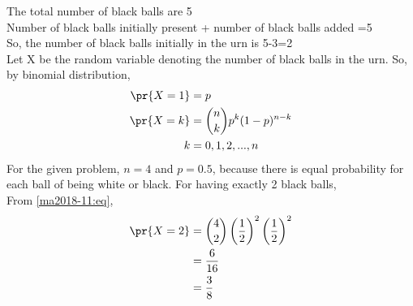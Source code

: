 
The total number of black balls are 5\\
Number of black balls initially present + number of black balls added =5\\
So, the number of black balls initially in the urn is 5-3=2\\
Let X be the random variable denoting the number of black balls in the urn. So, by binomial distribution, 
\begin{align}
    \pr{X=1}&=p\\
    \pr{X=k}&= {n\choose k} p^k (1-p)^{n-k}\\ \label{ma2018-11:eq}
    k&=0,1,2,...,n
\end{align}
For the given problem, $n=4$ and $p=0.5$, because there is equal probability for each ball of being white or black.
For having exactly 2 black balls, \\
From \eqref{ma2018-11:eq},
\begin{align}
    \pr{X=2}&= {4 \choose 2} \left(\frac{1}{2}\right)^2\left(\frac{1}{2}\right)^2\\
    &=\frac{6}{16}\\
    &=\frac{3}{8}
\end{align}